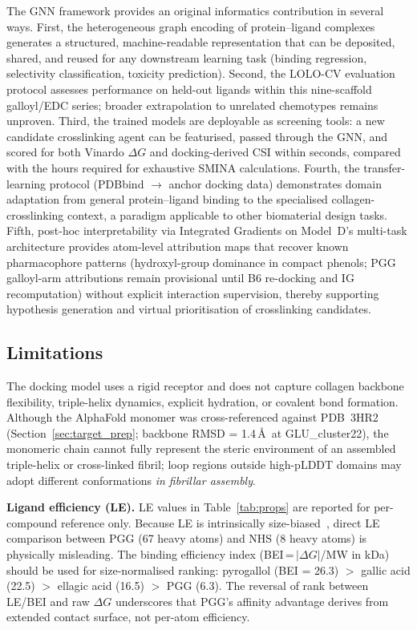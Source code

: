 \documentclass[11pt]{article}
\begin{document}
The GNN framework provides an original informatics contribution in several ways.
First, the heterogeneous graph encoding of protein--ligand complexes generates
a structured, machine-readable representation that can be deposited, shared,
and reused for any downstream learning task (binding regression, selectivity
classification, toxicity prediction).
Second, the LOLO-CV evaluation protocol assesses performance on
held-out ligands within this nine-scaffold galloyl/EDC series; broader
extrapolation to unrelated chemotypes remains unproven.
Third, the trained models are deployable as screening tools: a new candidate
crosslinking agent can be featurised, passed through the GNN, and scored for
both Vinardo $\Delta G$ and docking-derived CSI within seconds, compared with
the hours required for exhaustive SMINA calculations.
Fourth, the transfer-learning protocol (PDBbind $\rightarrow$ anchor docking
data) demonstrates domain adaptation from general protein--ligand binding to
the specialised collagen-crosslinking context, a paradigm applicable to other
biomaterial design tasks.
Fifth, post-hoc interpretability via Integrated Gradients on Model~D's
multi-task architecture provides atom-level attribution maps that
recover known pharmacophore patterns (hydroxyl-group dominance in
compact phenols; PGG galloyl-arm attributions remain provisional until
B6 re-docking and IG recomputation) without explicit
interaction supervision, thereby supporting hypothesis generation and
virtual prioritisation of crosslinking candidates.

\subsection{Limitations}
\label{sec:limitations}

The docking model uses a rigid receptor and does not capture collagen backbone
flexibility, triple-helix dynamics, explicit hydration, or covalent bond
formation.  Although the AlphaFold monomer was cross-referenced against
PDB~3HR2 (Section~\ref{sec:target_prep}; backbone RMSD = 1.4\,\AA\ at
GLU\_cluster22), the monomeric chain cannot fully represent the steric
environment of an assembled triple-helix or cross-linked fibril; loop
regions outside high-pLDDT domains may adopt different conformations
\emph{in fibrillar assembly}.

\textbf{Ligand efficiency (LE).}
LE values in Table~\ref{tab:props} are reported for per-compound reference
only.  Because LE is intrinsically size-biased~\cite{hopkins2014le}, direct
LE comparison between PGG (67 heavy atoms) and NHS (8 heavy atoms) is
physically misleading.  The binding efficiency index
(BEI\,=\,$|\Delta G|$/MW in kDa) should be used for size-normalised
ranking: pyrogallol (BEI = 26.3) $>$ gallic acid (22.5) $>$ ellagic acid
(16.5) $>$ PGG (6.3).  The reversal of rank between LE/BEI and raw
$\Delta G$ underscores that PGG's affinity advantage derives from extended
contact surface, not per-atom efficiency.
\end{document}
